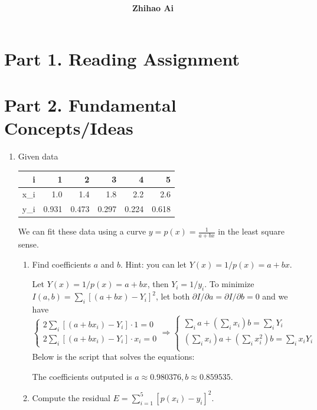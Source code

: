 \documentclass[10pt]{report}
\title{
	\vspace{2in}
	\textmd{\textbf{\hwCourse\\\hwTitle}}\\
	\vspace{0.3in}\large{\textit{\hmwkClassInstructor}}
	\vspace{3in}
}
\author{\textbf{Zhihao Ai}}
\date{}
\begin{document}
\maketitle

\section*{Part 1. Reading Assignment}

\section*{Part 2. Fundamental Concepts/Ideas}
\begin{enumerate}
	\item 
	Given data
	\begin{table}[H]
		\centering
		\begin{tabular}{*{6}{N}} \toprule
			i & 1 & 2 & 3 & 4 & 5 \\ \midrule
			x_i & 1.0 & 1.4 & 1.8 & 2.2 & 2.6\\
			y_i & 0.931 & 0.473 & 0.297 & 0.224 & 0.618\\
			\bottomrule
		\end{tabular}
	\end{table}
	We can fit these data using a curve $y=p(x)=\frac{1}{a+bx}$ in the least square sense.
	\begin{enumerate}
		\item 
		Find coefficients $a$ and $b$. Hint: you can let $Y(x)=1/p(x)=a+bx$.
		
		Let $Y(x) = 1/p(x) = a + bx$, then $Y_i = 1/y_i$. To minimize $I(a, b) = \sum_i [(a+bx) - Y_i]^2$, let both $\partial{I}/\partial{a} = \partial{I}/\partial{b} = 0$ and we have
		\[
		\begin{cases}
		2\sum_i [(a + b x_i) - Y_i] \cdot 1 = 0\\
		2\sum_i [(a + b x_i) - Y_i] \cdot x_i = 0
		\end{cases}
		\Rightarrow
		\begin{cases}
		\sum_i a + (\sum_i x_i)b = \sum_i Y_i\\
		(\sum_i x_i)a + (\sum_i x_i^2)b = \sum_i x_i Y_i\\
		\end{cases}
		\]
		Below is the script that solves the equations:
		
		The coefficients outputed is $a\approx 0.980376, b\approx 0.859535$.
		
		\item 
		Compute the residual $E = \sum_{i=1}^{5} [p(x_i) - y_i]^2$.
		

\end{enumerate}
\end{enumerate}
\end{document}
